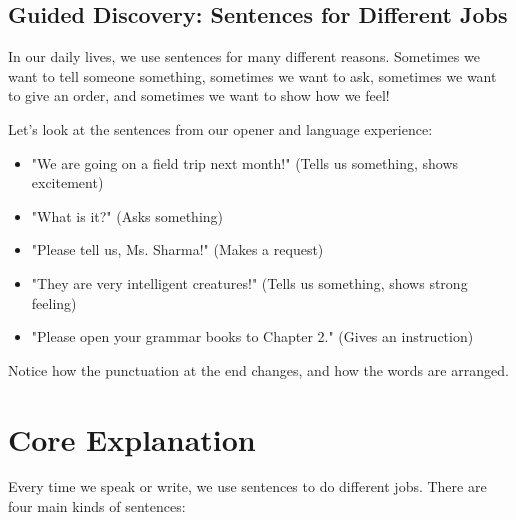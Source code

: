 \subsection*{Guided Discovery: Sentences for Different Jobs}
In our daily lives, we use sentences for many different reasons. Sometimes we want to tell someone something, sometimes we want to ask, sometimes we want to give an order, and sometimes we want to show how we feel!

Let's look at the sentences from our opener and language experience:
\begin{itemize}
    \item "We are going on a field trip next month!" (Tells us something, shows excitement)
    \item "What is it?" (Asks something)
    \item "Please tell us, Ms. Sharma!" (Makes a request)
    \item "They are very intelligent creatures!" (Tells us something, shows strong feeling)
    \item "Please open your grammar books to Chapter 2." (Gives an instruction)
\end{itemize}
Notice how the punctuation at the end changes, and how the words are arranged.

\section{Core Explanation}
Every time we speak or write, we use sentences to do different jobs. There are four main kinds of sentences:

